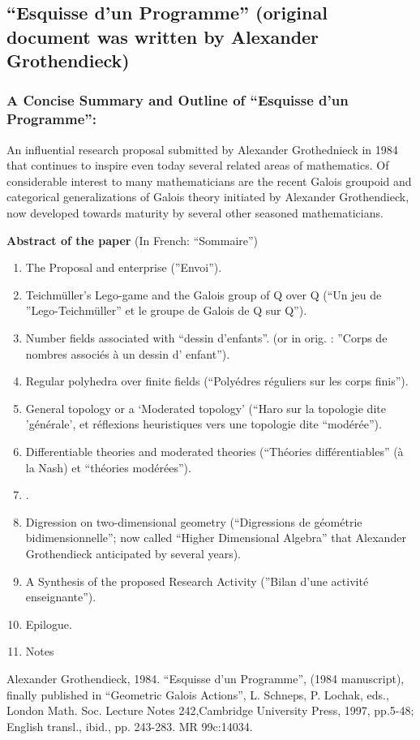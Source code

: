 \documentclass[12pt]{article}
\theoremstyle{plain}
\theoremstyle{definition}
\numberwithin{equation}{section}
\begin{document}
\subsection{``Esquisse d'un Programme'' (original document was written by Alexander Grothendieck)}

\subsubsection{A Concise Summary and Outline of ``Esquisse d'un Programme'':}
An influential research proposal submitted by Alexander Grothednieck in 1984 that 
continues to inspire even today several related areas of mathematics. Of considerable interest to many mathematicians are the recent Galois groupoid and categorical generalizations of Galois theory initiated by Alexander Grothendieck, now developed towards maturity by several other seasoned mathematicians. 

\textbf{Abstract of the paper}
(In French: ``Sommaire'')
\begin{enumerate}
\item The Proposal and enterprise (''Envoi''). 
\item Teichm\"uller's Lego-game and the Galois group of Q over Q (``Un jeu de ''Lego-Teichm\"uller'' et le groupe de Galois de Q sur Q''). 
\item Number fields associated with ``dessin d'enfants''. 
(or in orig. : ''Corps de nombres associ\'es \`a un dessin d' enfant''). 
\item Regular polyhedra over finite fields (``Poly\'edres r\'eguliers sur les corps finis''). 
\item General topology or a `Moderated topology' (``Haro sur la topologie dite 'g\'en\'erale', et r\'eflexions heuristiques vers une topologie dite ``mod\'er\'ee''). 
\item Differentiable theories and moderated theories (``Th\'eories diff\'erentiables'' (\`{a} la Nash) et ``th\'eories mod\'er\'ees''). 
\item {}. 
\item Digression on two-dimensional geometry (``Digressions de g\'eom\'etrie bidimensionnelle'';
now called ``Higher Dimensional Algebra'' that Alexander Grothendieck anticipated by several years). 
\item A Synthesis of the proposed Research Activity (''Bilan d'une activit\'e enseignante''). 
\item Epilogue. 
\item Notes 
\end{enumerate}


Alexander Grothendieck, 1984. ``Esquisse d'un Programme'', (1984 manuscript), finally published in ``Geometric Galois Actions'', L. Schneps, P. Lochak, eds., London Math. Soc. Lecture Notes 242,Cambridge University Press, 1997, pp.5-48; English transl., ibid., pp. 243-283. MR 99c:14034.
\end{document}
